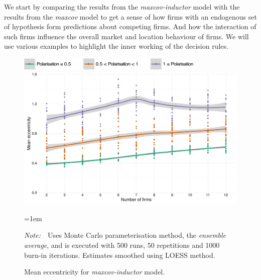 \documentclass[preprint, 12pt]{elsarticle}
\newcommand{\Figtext}[1]{%
	\begin{tablenotes}[para,flushleft]
		\hangindent=1em
		\footnotesize
		\raggedright
		#1
	\end{tablenotes}
}
\newcommand{\Fignote}[1]{\Figtext{\emph{Note:~}~#1}}
\begin{document}
We start by comparing the results from the \emph{maxcov-inductor} model with the results from the \emph{maxcov} model to get a sense of how firms with an endogenous set of hypothesis form predictions about competing firms. And how the interaction of such firms influence the overall market and location behaviour of firms. We will use various examples to highlight the inner working of the decision rules.

\begin{figure}[ht!]
	\centering
	\includegraphics[width=90mm]{Graphics/legend_pol.pdf}
	\includegraphics[width=\textwidth]{Graphics/fig611a.pdf}
	\caption{Mean eccentricity for \emph{maxcov-inductor} model.}
	\label{fig:eccentricity_mi}
	\Fignote{Uses Monte Carlo parameterisation method, the \emph{ensemble average}, and is executed with 500 runs, 50 repetitions and 1000 burn-in iterations. Estimates smoothed using LOESS method.}
\end{figure}
\end{document}
